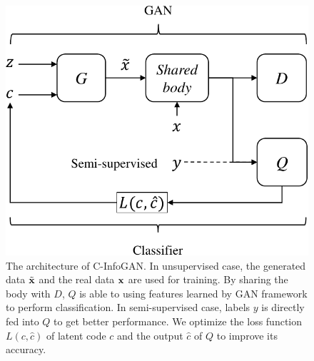 \begin{figure}[htbp]
  \centering
  \includegraphics[width=\onef\textwidth]{Img/arch-cinfogan.pdf} 
  {The architecture of C-InfoGAN. In unsupervised case, the generated data $\tilde{\mathbf{x}}$ and the real data $\mathbf{x}$ are used for training. By sharing the body with $D$, $Q$ is able to using features learned by GAN framework to perform classification. In semi-supervised case, labels $y$ is directly fed into $Q$ to get better performance. We optimize the loss function $L(c, \hat{c})$ of latent code $c$ and the output $\hat{c}$ of $Q$ to improve its accuracy.}
  \label{fig:c-infogan}
\end{figure}

